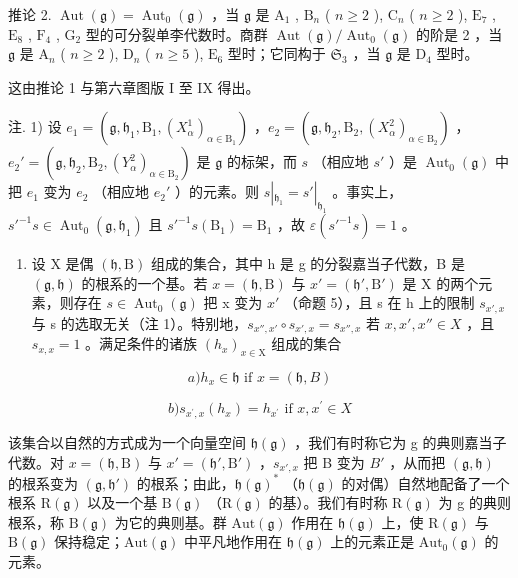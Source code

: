 推论 2. \(\operatorname{Aut}(\mathfrak{g}) = \operatorname{Aut}_0(\mathfrak{g})\) ，当 \(\mathfrak{g}\) 是 \(\mathrm{A}_1\) , \(\mathrm{B}_n\) ( \(n \geq 2\) ), \(\mathrm{C}_n\) ( \(n \geq 2\) ), \(\mathrm{E}_7\) , \(\mathrm{E}_8\) , \(\mathrm{F}_4\) , \(\mathrm{G}_2\) 型的可分裂单李代数时。商群 \(\operatorname{Aut}(\mathfrak{g}) / \operatorname{Aut}_0(\mathfrak{g})\) 的阶是 2 ，当 \(\mathfrak{g}\) 是 \(\mathrm{A}_n\) ( \(n \geq 2\) ), \(\mathrm{D}_n\) ( \(n \geq 5\) ), \(\mathrm{E}_6\) 型时；它同构于 \(\mathfrak{S}_3\) ，当 \(\mathfrak{g}\) 是 \(\mathrm{D}_4\) 型时。

这由推论 1 与第六章图版 I 至 IX 得出。

注. 1) 设 \(e_1 = (\mathfrak{g}, \mathfrak{h}_1, \mathrm{B}_1, (X_\alpha^1)_{\alpha \in \mathrm{B}_1})\) ，\(e_2 = (\mathfrak{g}, \mathfrak{h}_2, \mathrm{B}_2, (X_\alpha^2)_{\alpha \in \mathrm{B}_2})\) ，\(e_2' = (\mathfrak{g}, \mathfrak{h}_2, \mathrm{B}_2, (Y_\alpha^2)_{\alpha \in \mathrm{B}_2})\) 是 \(\mathfrak{g}\) 的标架，而 \(s\) （相应地 \(s'\) ）是 \(\operatorname{Aut}_0(\mathfrak{g})\) 中把 \(e_1\) 变为 \(e_2\) （相应地 \(e_2'\) ）的元素。则 \(s|_{\mathfrak{h}_1} = s'|_{\mathfrak{h}_1}\) 。事实上，\(s'^{-1}s \in \operatorname{Aut}_0(\mathfrak{g}, \mathfrak{h}_1)\) 且 \(s'^{-1}s(\mathrm{B}_1) = \mathrm{B}_1\) ，故 \(\varepsilon(s'^{-1}s) = 1\) 。

\begin{enumerate}
\def\labelenumi{\arabic{enumi})}
\setcounter{enumi}{1}
\tightlist
\item
  设 X 是偶 \((\mathfrak{h},\mathrm{B})\) 组成的集合，其中 h 是 g 的分裂嘉当子代数，B 是 \((\mathfrak{g},\mathfrak{h})\) 的根系的一个基。若 \(x=(\mathfrak{h},\mathrm{B})\) 与 \(x'=(\mathfrak{h}',\mathrm{B}')\) 是 X 的两个元素，则存在 \(s\in\operatorname{Aut}_{0}(\mathfrak{g})\) 把 x 变为 \(x'\) （命题 5），且 s 在 h 上的限制 \(s_{x',x}\) 与 s 的选取无关（注 1）。特别地，\(s_{x'',x'}\circ s_{x',x}=s_{x'',x}\) 若 \(x,x',x''\in X\) ，且 \(s_{x,x}=1\) 。满足条件的诸族 \((h_{x})_{x\in\mathrm{X}}\) 组成的集合
\end{enumerate}

\[
a) h _ {x} \in \mathfrak {h} \text {   if   } x = (\mathfrak {h}, B)
\]

\[
b) s _ {x ^ {\prime}, x} (h _ {x}) = h _ {x ^ {\prime}} \text { if } x, x ^ {\prime} \in X
\]

该集合以自然的方式成为一个向量空间 \(\mathfrak{h}(\mathfrak{g})\) ，我们有时称它为 g 的典则嘉当子代数。对 \(x = (\mathfrak{h}, \mathrm{B})\) 与 \(x' = (\mathfrak{h}', \mathrm{B}')\) ，\(s_{x', x}\) 把 B 变为 \(B'\) ，从而把 \((\mathfrak{g}, \mathfrak{h})\) 的根系变为 \((\mathfrak{g}, \mathfrak{h}')\) 的根系；由此，\(\mathfrak{h}(\mathfrak{g})^*\) （\(\mathfrak{h}(\mathfrak{g})\) 的对偶）自然地配备了一个根系 \(\mathrm{R}(\mathfrak{g})\) 以及一个基 \(\mathrm{B}(\mathfrak{g})\) （\(\mathrm{R}(\mathfrak{g})\) 的基）。我们有时称 \(\mathrm{R}(\mathfrak{g})\) 为 g 的典则根系，称 \(\mathrm{B}(\mathfrak{g})\) 为它的典则基。群 \(\mathrm{Aut}(\mathfrak{g})\) 作用在 \(\mathfrak{h}(\mathfrak{g})\) 上，使 \(\mathrm{R}(\mathfrak{g})\) 与 \(\mathrm{B}(\mathfrak{g})\) 保持稳定；\(\mathrm{Aut}(\mathfrak{g})\) 中平凡地作用在 \(\mathfrak{h}(\mathfrak{g})\) 上的元素正是 \(\mathrm{Aut}_0(\mathfrak{g})\) 的元素。

